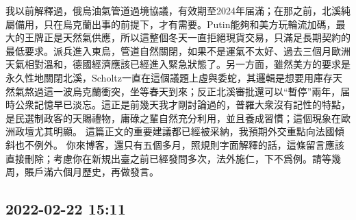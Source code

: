 \documentclass[twocolumn]{ctexart}
\begin{document}
我以前解釋過，俄烏油氣管道過境協議，有效期至2024年届滿；在那之前，北溪純屬備用，只在烏克蘭出事的前提下，才有需要。Putin能夠和美方玩輪流加碼，最大的王牌正是天然氣供應，所以這整個冬天一直拒絕現貨交易，只滿足長期契約的最低要求。派兵進入東烏，管道自然關閉，如果不是運氣不太好、過去三個月歐洲天氣相對溫和，德國經濟應該已經進入緊急狀態了。另一方面，雖然美方的要求是永久性地關閉北溪，Scholtz一直在這個議題上虛與委蛇，其邏輯是想要用庫存天然氣熬過這一波烏克蘭衝突，坐等春天到來；反正北溪審批還可以“暫停”兩年，届時公衆記憶早已淡忘。這正是前幾天我才剛討論過的，普羅大衆沒有記性的特點，是民選制政客的天賜禮物，庸碌之輩自然充分利用，並且養成習慣；這個現象在歐洲政壇尤其明顯。
這篇正文的重要建議都已經被采納，我預期外交重點向法國傾斜也不例外。
你來博客，還只有五個多月，照規則字面解釋的話，這條留言應該直接刪除；考慮你在新規出臺之前已經發問多次，法外施仁，下不爲例。請等幾周，賬戶滿六個月歷史，再做發言。
\subsection*{2022-02-22 15:11}
\end{document}
